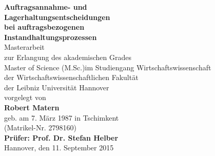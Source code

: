 \documentclass[a4paper,12pt,normalheadings,footexclude,headinclude,liststotoc,nochapterprefix,onecolumn,oneside,parskip,pointlessnumbers]{scrreprt}
\begin{document}
\newpage\thispagestyle{empty}\null\newpage
{}  %

\begin{titlepage}
\begin{sffamily}
\begin{center}
  {\Huge{\bf Auftragsannahme- und}}\\[0.5cm]
    {\Huge{\bf Lagerhaltungsentscheidungen}}\\[0.5cm]
  {\Huge{\bf bei auftragsbezogenen}} \\[0.5cm]
    {\Huge{\bf Instandhaltungsprozessen}} \\[3cm]
  {\huge Masterarbeit} \\[1cm]
  {\Large zur Erlangung des akademischen Grades \\
  \glqq Master of Science (M.Sc.)\grqq\;im Studiengang Wirtschaftswissenschaft} \\[8mm]
  {\Large der Wirtschaftswissenschaftlichen Fakult\"{a}t \\
  der Leibniz Universit\"{a}t Hannover} \\[2cm]
  {\Large vorgelegt von} \\[8mm]
  {\Large\bf Robert Matern} \\[5mm]
  {\Large geb. am 7. März 1987 in Tschimkent } \\[2mm]
  {\Large (Matrikel-Nr. 2798160)} \\[2cm]
  {\Large\bf Pr\"{u}fer: Prof. Dr. Stefan Helber} \\[6mm]
  {\Large Hannover, den 11. September 2015}
  \end{center}
  \end{sffamily}
\end{titlepage}
\newpage


\tableofcontents

\end{document}
